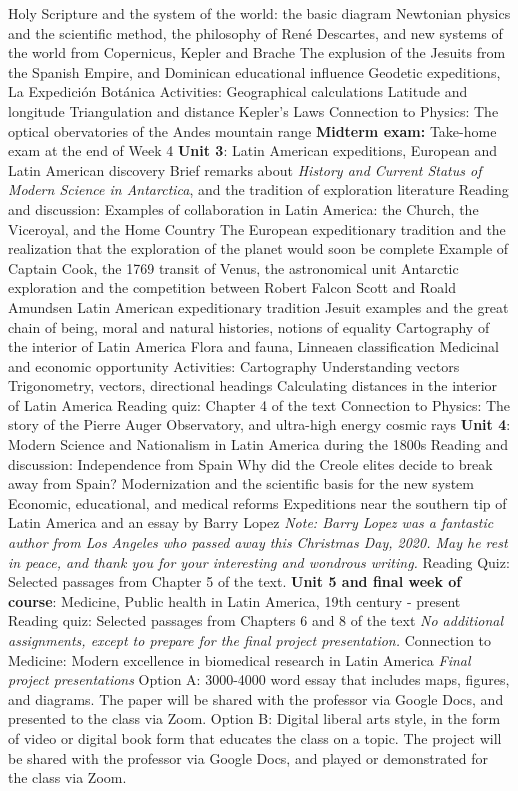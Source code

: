 \documentclass[10pt]{article}
\begin{document}
\begin{outline}[enumerate]
\3 Holy Scripture and the system of the world: the basic diagram
\3 Newtonian physics and the scientific method, the philosophy of Ren\'{e} Descartes, and new systems of the world from Copernicus, Kepler and Brache
\3 The explusion of the Jesuits from the Spanish Empire, and Dominican educational influence
\3 Geodetic expeditions, La Expedici\'{o}n Bot\'{a}nica
\2 Activities: Geographical calculations
\3 Latitude and longitude
\3 Triangulation and distance
\3 Kepler's Laws
\2 Connection to Physics: The optical obervatories of the Andes mountain range
\1 \textbf{Midterm exam:} Take-home exam at the end of Week 4
\1 \textbf{Unit 3}: Latin American expeditions, European and Latin American discovery
\2 Brief remarks about \textit{History and Current Status of Modern Science in Antarctica}, and the tradition of exploration literature
\2 Reading and discussion: Examples of collaboration in Latin America: the Church, the Viceroyal, and the Home Country
\3 The European expeditionary tradition and the realization that the exploration of the planet would soon be complete
\4 Example of Captain Cook, the 1769 transit of Venus, the astronomical unit
\4 Antarctic exploration and the competition between Robert Falcon Scott and Roald Amundsen
\3 Latin American expeditionary tradition
\4 Jesuit examples and the great chain of being, moral and natural histories, notions of equality
\4 Cartography of the interior of Latin America
\4 Flora and fauna, Linneaen classification
\4 Medicinal and economic opportunity
\2 Activities: Cartography
\3 Understanding vectors
\3 Trigonometry, vectors, directional headings
\3 Calculating distances in the interior of Latin America
\2 Reading quiz: Chapter 4 of the text
\2 Connection to Physics: The story of the Pierre Auger Observatory, and ultra-high energy cosmic rays
\1 \textbf{Unit 4}: Modern Science and Nationalism in Latin America during the 1800s
\2 Reading and discussion: Independence from Spain
\3 Why did the Creole elites decide to break away from Spain?
\3 Modernization and the scientific basis for the new system
\3 Economic, educational, and medical reforms
\2 Expeditions near the southern tip of Latin America and an essay by Barry Lopez
\3 \textit{Note: Barry Lopez was a fantastic author from Los Angeles who passed away this Christmas Day, 2020.  May he rest in peace, and thank you for your interesting and wondrous writing.}
\2 Reading Quiz: Selected passages from Chapter 5 of the text.
\1 \textbf{Unit 5 and final week of course}: Medicine, Public health in Latin America, 19th century - present
\2 Reading quiz: Selected passages from Chapters 6 and 8 of the text
\2 \textit{No additional assignments, except to prepare for the final project presentation.}
\2 Connection to Medicine: Modern excellence in biomedical research in Latin America
\2 \textit{Final project presentations}
\3 Option A: 3000-4000 word essay that includes maps, figures, and diagrams. The paper will be shared with the professor via Google Docs, and presented to the class via Zoom.
\3 Option B: Digital liberal arts style, in the form of video or digital book form that educates the class on a topic.  The project will be shared with the professor via Google Docs, and played or demonstrated for the class via Zoom.
\end{outline}
\end{document}
